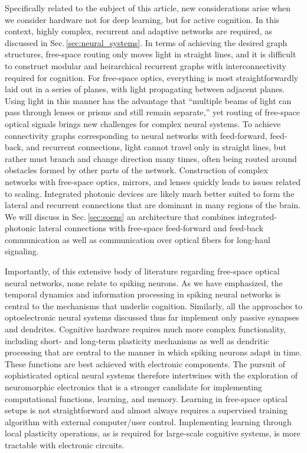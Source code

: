 Specifically related to the subject of this article, new considerations arise when we consider hardware not for deep learning, but for active cognition. In this context, highly complex, recurrent and adaptive networks are required, as discussed in Sec.\,\ref{sec:neural_systems}. In terms of achieving the desired graph structures, free-space routing only moves light in straight lines, and it is difficult to construct modular and heirarchical recurrent graphs with interconnectivity required for cognition. For free-space optics, everything is most straightforwardly laid out in a series of planes, with light propagating between adjacent planes. Using light in this manner has the advantage that ``multiple beams of light can pass through lenses or prisms and still remain separate,'' \cite{abps1987} yet routing of free-space optical signals brings new challenges for complex neural systems. To achieve connectivity graphs corresponding to neural networks with feed-forward, feed-back, and recurrent connections, light cannot travel only in straight lines, but rather must branch and change direction many times, often being routed around obstacles formed by other parts of the network. Construction of complex networks with free-space optics, mirrors, and lenses quickly leads to issues related to scaling. Integrated photonic devices are likely much better suited to form the lateral and recurrent connections that are dominant in many regions of the brain. We will discuss in Sec.\,\ref{sec:soens} an architecture that combines integrated-photonic lateral connections with free-space feed-forward and feed-back communication as well as communication over optical fibers for long-haul signaling. 

Importantly, of this extensive body of literature regarding free-space optical neural networks, none relate to spiking neurons. As we have emphasized, the temporal dynamics and information processing in spiking neural networks is central to the mechanisms that underlie cognition. Similarly, all the approaches to optoelectronic neural systems discussed thus far implement only passive synapses and dendrites. Cognitive hardware requires much more complex functionality, including short- and long-term plasticity mechanisms as well as dendritic processing that are central to the manner in which spiking neurons adapt in time. These functions are best achieved with electronic components. The pursuit of sophisticated optical neural systems therefore intertwines with the exploration of neuromorphic electronics that is a stronger candidate for implementing computational functions, learning, and memory. Learning in free-space optical setups is not straightforward and almost always requires a supervised training algorithm with external computer/user control. Implementing learning through local plasticity operations, as is required for large-scale cognitive systems, is more tractable with electronic circuits. 

